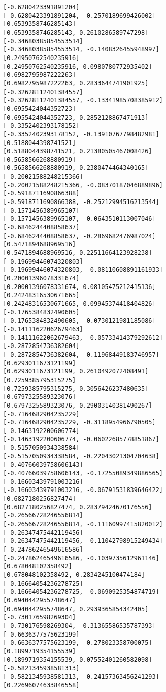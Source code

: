 \documentclass[11pt]{article}
\begin{document}
\begin{Verbatim}[commandchars=\\\{\}]
[-0.6280423391891204]
[-0.6280423391891204, -0.2570189699426002]
[0.6539358746285143]
[0.6539358746285143, 0.2610286589747298]
[-0.34680385854553514]
[-0.34680385854553514, -0.1408326455948997]
[0.24950762540235916]
[0.24950762540235916, 0.0980780772935402]
[0.6982795987222263]
[0.6982795987222263, 0.2833644741901925]
[-0.32628112401384557]
[-0.32628112401384557, -0.13341985708385912]
[0.6955424044352723]
[0.6955424044352723, 0.2852128867471913]
[-0.3352402393178152]
[-0.3352402393178152, -0.13910767798482981]
[0.5188044398741521]
[0.5188044398741521, 0.21380505467008426]
[0.5658566268880919]
[0.5658566268880919, 0.2380474464340165]
[-0.20021588248215366]
[-0.20021588248215366, -0.08370187046889896]
[-0.5918711690866388]
[-0.5918711690866388, -0.25212994516213544]
[-0.1571456389965107]
[-0.1571456389965107, -0.0643510113007046]
[-0.6846244408858637]
[-0.6846244408858637, -0.2869682476987024]
[0.5471894688969516]
[0.5471894688969516, 0.22511664123928238]
[-0.19699446074320803]
[-0.19699446074320803, -0.08110608891161933]
[0.20001396078331674]
[0.20001396078331674, 0.08105475212415136]
[0.24248316530671665]
[0.24248316530671665, 0.09945374418404826]
[-0.1765384832490605]
[-0.1765384832490605, -0.0730121981185086]
[-0.14111622062679463]
[-0.14111622062679463, -0.05733414379292612]
[-0.2872854736382604]
[-0.2872854736382604, -0.11968449183746957]
[0.6293011673121199]
[0.6293011673121199, 0.2610492072408491]
[0.7259385795315275]
[0.7259385795315275, 0.3056426237480635]
[0.6797325589323076]
[0.6797325589323076, 0.29003140381490267]
[-0.7164682904235229]
[-0.7164682904235229, -0.3118954966790505]
[-0.1463192200606774]
[-0.1463192200606774, -0.06022685778851867]
[-0.5157050934338584]
[-0.5157050934338584, -0.22043021304704638]
[-0.40766039758606143]
[-0.40766039758606143, -0.17255089349886565]
[-0.16603439791003216]
[-0.16603439791003216, -0.06791531839646422]
[0.6827180256827474]
[0.6827180256827474, 0.28379424670176556]
[-0.26566728246556814]
[-0.26566728246556814, -0.11160997415820012]
[-0.26347475442119456]
[-0.26347475442119456, -0.11042798915249434]
[-0.24786246549616586]
[-0.24786246549616586, -0.1039735612961146]
[0.678048102358492]
[0.678048102358492, 0.2834245100474184]
[-0.16664054236278725]
[-0.16664054236278725, -0.0690925354874719]
[0.6940442955748647]
[0.6940442955748647, 0.2939365854342405]
[-0.730176598269304]
[-0.730176598269304, -0.31365586535787393]
[-0.6636377575623199]
[-0.6636377575623199, -0.278023358700075]
[0.1899719354155539]
[0.1899719354155539, 0.07552401260582098]
[-0.5821345938581313]
[-0.5821345938581313, -0.24157363456241293]
[0.22696074633846558]

\end{Verbatim}
\end{document}
